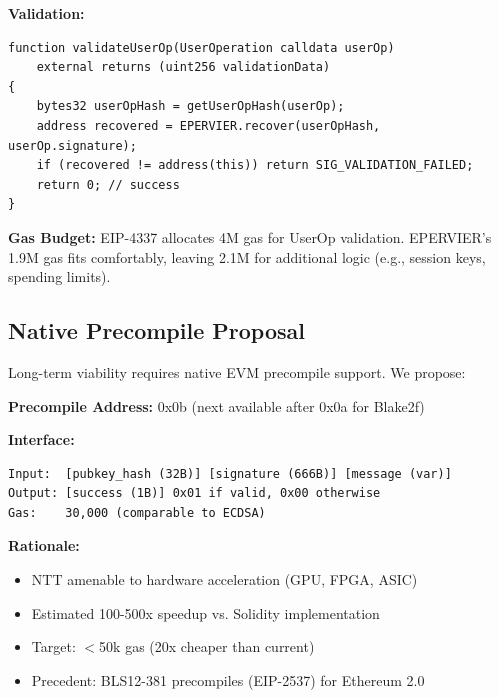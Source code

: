 \textbf{Validation:}
\begin{lstlisting}[language=Solidity]
function validateUserOp(UserOperation calldata userOp)
    external returns (uint256 validationData)
{
    bytes32 userOpHash = getUserOpHash(userOp);
    address recovered = EPERVIER.recover(userOpHash, userOp.signature);
    if (recovered != address(this)) return SIG_VALIDATION_FAILED;
    return 0; // success
}
\end{lstlisting}

\textbf{Gas Budget:} EIP-4337 allocates 4M gas for UserOp validation. EPERVIER's 1.9M gas fits comfortably, leaving 2.1M for additional logic (e.g., session keys, spending limits).

\subsection{Native Precompile Proposal}

Long-term viability requires native EVM precompile support. We propose:

\textbf{Precompile Address:} 0x0b (next available after 0x0a for Blake2f)

\textbf{Interface:}
\begin{lstlisting}
Input:  [pubkey_hash (32B)] [signature (666B)] [message (var)]
Output: [success (1B)] 0x01 if valid, 0x00 otherwise
Gas:    30,000 (comparable to ECDSA)
\end{lstlisting}

\textbf{Rationale:}
\begin{itemize}
    \item NTT amenable to hardware acceleration (GPU, FPGA, ASIC)
    \item Estimated 100-500x speedup vs. Solidity implementation
    \item Target: $<$50k gas (20x cheaper than current)
    \item Precedent: BLS12-381 precompiles (EIP-2537) for Ethereum 2.0
\end{itemize}

